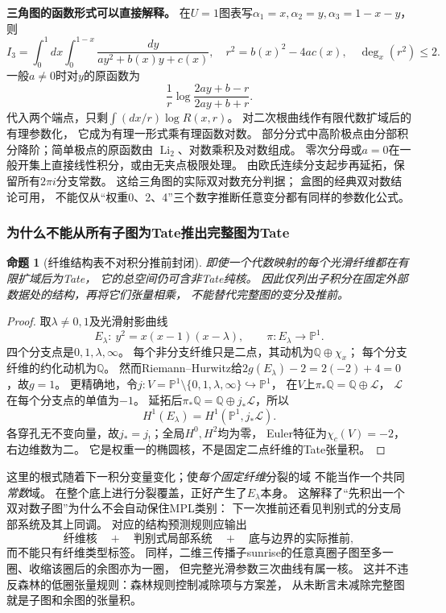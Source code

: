 \documentclass[11pt,a4paper,oneside]{ctexart}
\theoremstyle{cnplain}
\newtheorem{proposition}[theorem]{命题}
\theoremstyle{definition}
\theoremstyle{remark}
\newcommand{\Q}{\mathbb Q}
\numberwithin{equation}{section}
\begin{document}
\textbf{三角图的函数形式可以直接解释。}
在$U=1$图表写$\alpha_1=x,\alpha_2=y,\alpha_3=1-x-y$，则
\[
 I_3=\int_0^1dx\int_0^{1-x}\frac{dy}{a y^2+b(x)y+c(x)},
 \quad r^2=b(x)^2-4ac(x),\quad\deg_x(r^2)\le2.
\]
一般$a\ne0$时对$y$的原函数为
\[
 \frac1r\log\frac{2ay+b-r}{2ay+b+r}.
\]
代入两个端点，只剩$\int(dx/r)\log R(x,r)$。
对二次根曲线作有限代数扩域后的有理参数化，
它成为有理一形式乘有理函数对数。
部分分式中高阶极点由分部积分降阶；简单极点的原函数由
$\operatorname{Li}_2$、对数乘积及对数组成。
零次分母或$a=0$在一般开集上直接线性积分，或由无夹点极限处理。
由欧氏连续分支起步再延拓，保留所有$2\pi i$分支常数。
这给三角图的实际双对数充分判据；
盒图的经典双对数结论可用\cite[\S8--9]{bkone}，
不能仅从“权重0、2、4”三个数字推断任意变分都有同样的参数化公式。

\subsubsection{为什么不能从所有子图为Tate推出完整图为Tate}
\begin{proposition}[纤维结构表不对积分推前封闭]\label{unified:prop:fiberwarning}
即使一个代数映射的每个光滑纤维都在有限扩域后为Tate，
它的总空间仍可含非Tate纯核。
因此仅列出子积分在固定外部数据处的结构，再将它们张量相乘，
不能替代完整图的变分及推前。
\end{proposition}
\begin{proof}
取$\lambda\ne0,1$及光滑射影曲线
\[
 E_\lambda:\ y^2=x(x-1)(x-\lambda),\qquad
 \pi:E_\lambda\longrightarrow\mathbb P^1.
\]
四个分支点是$0,1,\lambda,\infty$。
每个非分支纤维只是二点，其动机为$\Q\oplus\chi_x$；
每个分支纤维的约化动机为$\Q$。
然而Riemann--Hurwitz给$2g(E_\lambda)-2=2(-2)+4=0$，故$g=1$。
更精确地，令$j:V=\mathbb P^1\setminus\{0,1,\lambda,\infty\}\hookrightarrow\mathbb P^1$，
在$V$上$\pi_*\Q=\Q\oplus\mathcal L$，
$\mathcal L$在每个分支点的单值为$-1$。
延拓后$\pi_*\Q=\Q\oplus j_*\mathcal L$，所以
\[
 H^1(E_\lambda)=H^1(\mathbb P^1,j_*\mathcal L).
\]
各穿孔无不变向量，故$j_*=j_!$；全局$H^0,H^2$均为零，
Euler特征为$\chi_c(V)=-2$，右边维数为二。
它是权重一的椭圆核，不是固定二点纤维的Tate张量积。
\end{proof}

这里的根式随着下一积分变量变化；使\emph{每个固定纤维}分裂的域
不能当作一个共同\emph{常数}域。
在整个底上进行分裂覆盖，正好产生了$E_\lambda$本身。
这解释了“先积出一个双对数子图”为什么不会自动保住MPL类别：
下一次推前还看见判别式的分支局部系统及其上同调。
对应的结构预测规则应输出
\[
 \text{纤维核}\quad+\quad\text{判别式局部系统}\quad+
       \quad\text{底与边界的实际推前},
\]
而不能只有纤维类型标签。
同样，二维三传播子sunrise的任意真圈子图至多一圈、收缩该圈后的余图亦为一圈，
但完整光滑参数三次曲线有属一核。
这并不违反森林的低圈张量规则：森林规则控制减除项与方案差，
从未断言未减除完整图就是子图和余图的张量积。
\end{document}
